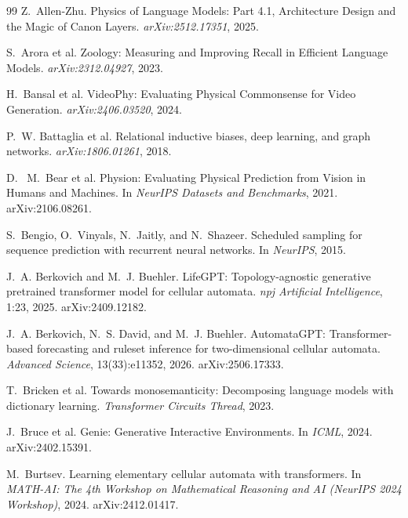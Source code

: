 \documentclass[11pt]{article}
\begin{document}
\clearpage
\begin{thebibliography}{99}
Z.~Allen-Zhu.
Physics of Language Models: Part 4.1, Architecture Design and the Magic of Canon Layers. \emph{arXiv:2512.17351}, 2025.

S.~Arora et al.
Zoology: Measuring and Improving Recall in Efficient Language Models. \emph{arXiv:2312.04927}, 2023.

H.~Bansal et al.
VideoPhy: Evaluating Physical Commonsense for Video Generation. \emph{arXiv:2406.03520}, 2024.

P.~W. Battaglia et al.
Relational inductive biases, deep learning, and graph networks.
\emph{arXiv:1806.01261}, 2018.

D.~ M.~Bear et al.
Physion: Evaluating Physical Prediction from Vision in Humans and Machines. In \emph{NeurIPS Datasets and Benchmarks}, 2021. arXiv:2106.08261.

S.~Bengio, O.~Vinyals, N.~Jaitly, and N.~Shazeer.
Scheduled sampling for sequence prediction with recurrent neural networks.
In \emph{NeurIPS}, 2015.

J.~A. Berkovich and M.~J. Buehler.
LifeGPT: Topology-agnostic generative pretrained transformer model for
cellular automata. \emph{npj Artificial Intelligence}, 1:23, 2025.
arXiv:2409.12182.

J.~A. Berkovich, N.~S. David, and M.~J. Buehler.
AutomataGPT: Transformer-based forecasting and ruleset inference for
two-dimensional cellular automata. \emph{Advanced Science}, 13(33):e11352,
2026. arXiv:2506.17333.

T.~Bricken et al.
Towards monosemanticity: Decomposing language models with dictionary learning.
\emph{Transformer Circuits Thread}, 2023.

J.~Bruce et al.
Genie: Generative Interactive Environments. In \emph{ICML}, 2024. arXiv:2402.15391.

M.~Burtsev.
Learning elementary cellular automata with transformers.
In \emph{MATH-AI: The 4th Workshop on Mathematical Reasoning and AI (NeurIPS
2024 Workshop)}, 2024. arXiv:2412.01417.


\end{thebibliography}
\end{document}
